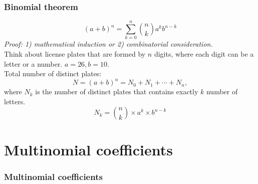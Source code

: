 \documentclass[slidestop,compress,mathserif]{beamer}
\begin{document}
\begin{frame}\frametitle{Binomial theorem}

\[
(a + b)^n = \sum_{k = 0}^n {n \choose k} a^k b^{n-k}
\]
{\it Proof: 1) mathematical induction or 2) combinatorial consideration.}\\
\pause
Think about license plates that are formed by $n$ digits, where each digit can be a letter or a number.
$a = 26, b = 10$. \\
\pause
Total number of distinct plates:
\[
N = (a + b)^n = N_0 + N_1 + \cdots + N_n,
\]
where $N_k$ is the number of distinct plates that contains exactly $k$ number of letters.
\pause
\[
N_k = {n \choose k} \times a^k \times b^{n-k}
\]
\vfill
\end{frame}




\section{Multinomial coefficients}
\begin{frame}\frametitle{Multinomial coefficients}


\end{frame}
\end{document}

